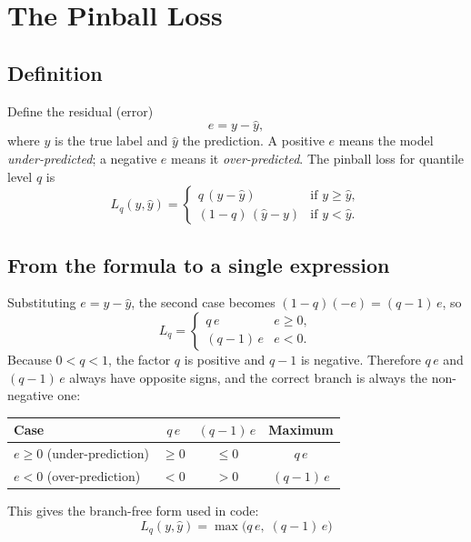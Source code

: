 \documentclass[11pt]{article}
\begin{document}
\section{The Pinball Loss}
\label{sec:pinball}

\subsection{Definition}

Define the residual (error)
\[
  e = y - \hat y,
\]
where $y$ is the true label and $\hat y$ the prediction. A positive $e$ means
the model \emph{under-predicted}; a negative $e$ means it
\emph{over-predicted}. The pinball loss for quantile level $q$ is
\[
  L_q(y, \hat y) =
  \begin{cases}
    q\,(y - \hat y)     & \text{if } y \ge \hat y, \\
    (1-q)\,(\hat y - y) & \text{if } y < \hat y.
  \end{cases}
\]

\subsection{From the formula to a single expression}

Substituting $e = y - \hat y$, the second case becomes
$(1-q)(-e) = (q-1)\,e$, so
\[
  L_q =
  \begin{cases}
    q\,e     & e \ge 0, \\
    (q-1)\,e & e < 0.
  \end{cases}
\]
Because $0 < q < 1$, the factor $q$ is positive and $q-1$ is negative.
Therefore $q\,e$ and $(q-1)\,e$ always have opposite signs, and the correct
branch is always the non-negative one:

\begin{center}
  \begin{tabular}{@{}lccc@{}}
    \toprule
    Case                         & $q\,e$  & $(q-1)\,e$ & Maximum    \\
    \midrule
    $e \ge 0$ (under-prediction) & $\ge 0$ & $\le 0$    & $q\,e$     \\
    $e < 0$ (over-prediction)    & $< 0$   & $> 0$      & $(q-1)\,e$ \\
    \bottomrule
  \end{tabular}
\end{center}

This gives the branch-free form used in code:
\[
  \boxed{\,L_q(y,\hat y) = \max\big(q\,e,\; (q-1)\,e\big)\,}
\]
\end{document}
